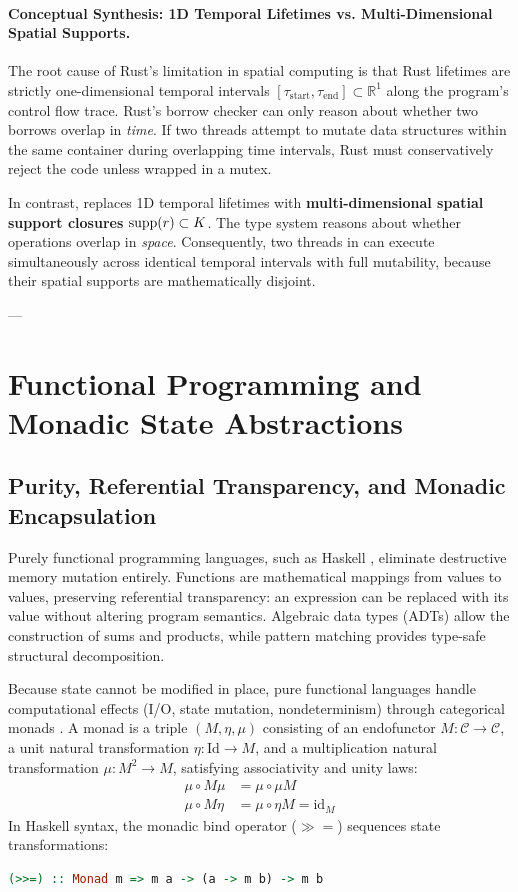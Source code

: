 \paragraph{Conceptual Synthesis: 1D Temporal Lifetimes vs. Multi-Dimensional Spatial Supports.}
The root cause of Rust's limitation in spatial computing is that Rust lifetimes are strictly one-dimensional temporal intervals $[\tau_{\text{start}}, \tau_{\text{end}}] \subset \mathbb{R}^1$ along the program's control flow trace. Rust's borrow checker can only reason about whether two borrows overlap in \textit{time}. If two threads attempt to mutate data structures within the same container during overlapping time intervals, Rust must conservatively reject the code unless wrapped in a mutex. 

In contrast, \ToposLang{} replaces 1D temporal lifetimes with \textbf{multi-dimensional spatial support closures} $\operatorname{supp}(r) \subset K$. The \ToposLang{} type system reasons about whether operations overlap in \textit{space}. Consequently, two threads in \ToposLang{} can execute simultaneously across identical temporal intervals with full mutability, because their spatial supports are mathematically disjoint.

---

\section{Functional Programming and Monadic State Abstractions}
\label{sec:functional_haskell}

\subsection{Purity, Referential Transparency, and Monadic Encapsulation}
Purely functional programming languages, such as Haskell \cite{marlow2009haskell}, eliminate destructive memory mutation entirely. Functions are mathematical mappings from values to values, preserving referential transparency: an expression can be replaced with its value without altering program semantics. Algebraic data types (ADTs) allow the construction of sums and products, while pattern matching provides type-safe structural decomposition.

Because state cannot be modified in place, pure functional languages handle computational effects (I/O, state mutation, nondeterminism) through categorical monads \cite{pierce2002types}. A monad is a triple $(M, \eta, \mu)$ consisting of an endofunctor $M : \mathcal{C} \to \mathcal{C}$, a unit natural transformation $\eta : \text{Id} \to M$, and a multiplication natural transformation $\mu : M^2 \to M$, satisfying associativity and unity laws:
\begin{align}
    \mu \circ M\mu &= \mu \circ \mu M \\
    \mu \circ M\eta &= \mu \circ \eta M = \text{id}_M
\end{align}
In Haskell syntax, the monadic bind operator ($\gg=$) sequences state transformations:
\begin{lstlisting}[language=Haskell]
(>>=) :: Monad m => m a -> (a -> m b) -> m b
\end{lstlisting}

